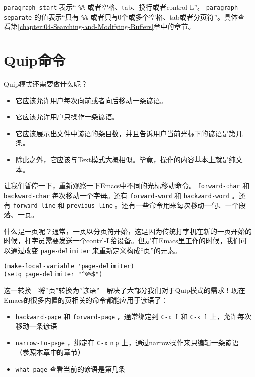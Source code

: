 \texttt{paragraph-start} 表示“ \verb|%%| 或者空格、tab、换行或者control-L”。 \texttt{paragraph-separate} 的值表示“只有 \verb|%%| 或者只有0个或多个空格、tab或者分页符”。具体查看第\ref{chapter:04-Searching-and-Modifying-Buffers}章中的章节。

\section{Quip命令}
\label{section:09-Quip-Commands}

Quip模式还需要做什么呢？

\begin{itemize}
  \item 它应该允许用户每次向前或者向后移动一条谚语。
  \item 它应该允许用户只操作一条谚语。
  \item 它应该展示出文件中谚语的条目数，并且告诉用户当前光标下的谚语是第几条。
  \item 除此之外，它应该与Text模式大概相似。毕竟，操作的内容基本上就是纯文本。
\end{itemize}

让我们暂停一下，重新观察一下Emacs中不同的光标移动命令。 \texttt{forward-char} 和 \texttt{backward-char} 每次移动一个字母。还有 \texttt{forward-word} 和 \texttt{backward-word} 。还有 \texttt{forward-line} 和 \texttt{previous-line} 。还有一些命令用来每次移动一句、一个段落、一页。

什么是一页呢？通常，一页以分页符开始，这是因为传统打字机在新的一页开始的时候，打字员需要发送一个contrl-L给设备。但是在Emacs里工作的时候，我们可以通过改变 \texttt{page-delimiter} 来重新定义构成“页”的元素。

\begin{verbatim}
(make-local-variable 'page-delimiter)
(setq page-delimiter "^%%$")
\end{verbatim}

这一转换---将“页”转换为“谚语”---解决了大部分我们对于Quip模式的需求！现在Emacs的很多内置的页相关的命令都能应用于谚语了：

\begin{itemize}
  \item \texttt{backward-page} 和 \texttt{forward-page} ，通常绑定到 \verb|C-x [| 和 \verb|C-x ]| 上，允许每次移动一条谚语
  \item \texttt{narrow-to-page} ，绑定在 \verb|C-x| \verb|n| \verb|p| 上，通过narrow操作来只编辑一条谚语（参照本章中的章节）
  \item \texttt{what-page} 查看当前的谚语是第几条
\end{itemize}

